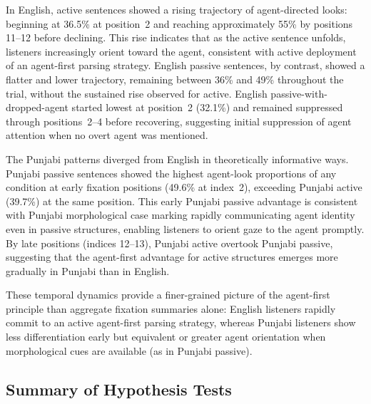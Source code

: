 \documentclass[12pt, a4paper]{article}
\begin{document}
In English, active sentences showed a rising trajectory of agent-directed looks:
beginning at 36.5\% at position~2 and reaching approximately 55\% by positions
11--12 before declining.
This rise indicates that as the active sentence unfolds, listeners increasingly
orient toward the agent, consistent with active deployment of an agent-first
parsing strategy.
English passive sentences, by contrast, showed a flatter and lower trajectory,
remaining between 36\% and 49\% throughout the trial, without the sustained
rise observed for active.
English passive-with-dropped-agent started lowest at position~2 (32.1\%) and
remained suppressed through positions~2--4 before recovering, suggesting
initial suppression of agent attention when no overt agent was mentioned.

The Punjabi patterns diverged from English in theoretically informative ways.
Punjabi passive sentences showed the highest agent-look proportions of any
condition at early fixation positions (49.6\% at index~2), exceeding Punjabi
active (39.7\%) at the same position.
This early Punjabi passive advantage is consistent with Punjabi morphological
case marking rapidly communicating agent identity even in passive structures,
enabling listeners to orient gaze to the agent promptly.
By late positions (indices 12--13), Punjabi active overtook Punjabi passive,
suggesting that the agent-first advantage for active structures emerges
more gradually in Punjabi than in English.

These temporal dynamics provide a finer-grained picture of the agent-first
principle than aggregate fixation summaries alone:
English listeners rapidly commit to an active agent-first parsing strategy,
whereas Punjabi listeners show less differentiation early but equivalent or
greater agent orientation when morphological cues are available (as in Punjabi passive).

\subsection{Summary of Hypothesis Tests}
\end{document}
